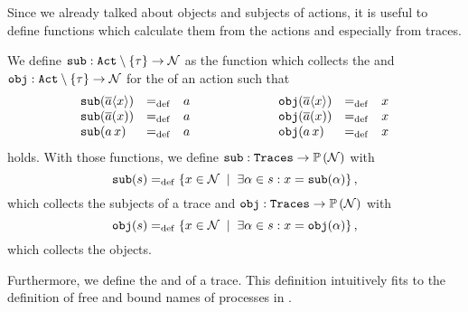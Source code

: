 Since we already talked about objects and subjects of actions, it is useful to define functions which calculate them from the actions and especially from traces.

\begin{definition}
\label{def_sub_obj}
	We define $\subF: \actions\setminus\set{\tau} \rightarrow \names$ as the function which collects the  and $\objF: \actions\setminus\set{\tau} \rightarrow \names$ for the  of an action such that
	\begin{equation*}
		\begin{aligned}
			\begin{array}{lcl}
				\mathtt{sub}(\overline{a}\langle x\rangle) & =_{\mathrm{def}} & a \\
				\mathtt{sub}(\overline{a}(x)) & =_{\mathrm{def}} & a \\
				\mathtt{sub}(a\,x) & =_{\mathrm{def}} & a 
			\end{array}
		\end{aligned}\quad\quad\quad\quad\quad\quad
		\begin{aligned}
		\begin{array}{lcl}
			\mathtt{obj}(\overline{a}\langle x\rangle) & =_{\mathrm{def}} & x \\
			\mathtt{obj}(\overline{a}(x)) & =_{\mathrm{def}} & x \\
			\mathtt{obj}(a\,x) & =_{\mathrm{def}} & x 
		\end{array}
	\end{aligned}
\end{equation*}
holds. With those functions, we define $\mathtt{sub}: \mathtt{Traces} \rightarrow \mathbb P\left(\mathcal N\right)$ with
	\[\sub{s} \define \set[\exists\alpha\in{}s: x=\sub{\alpha}]{x\in\names},\]
which collects the subjects of a trace and $\mathtt{obj}: \mathtt{Traces} \rightarrow \mathbb P\left(\mathcal N\right)$ with
\[\obj{s} \define \set[\exists\alpha\in{}s: x=\obj{\alpha}]{x\in\names},\]
which collects the objects.
\end{definition}

Furthermore, we %
define the  and  of a trace. This definition intuitively fits to the definition of free and bound names of processes in .

